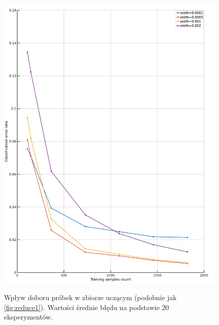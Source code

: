 \documentclass[a4paper]{article}
\begin{document}
\begin{figure}[h]
    \caption[]{Wpływ doboru próbek w zbiorze uczącym (podobnie jak \ref{fig:reduce1}).
        Wartości średnie błędu na podstawie 20 eksperymentów.}
    \centering
    \includegraphics[width=1.0\textwidth]{window.png}
    \label{fig:window}
\end{figure}
\end{document}
